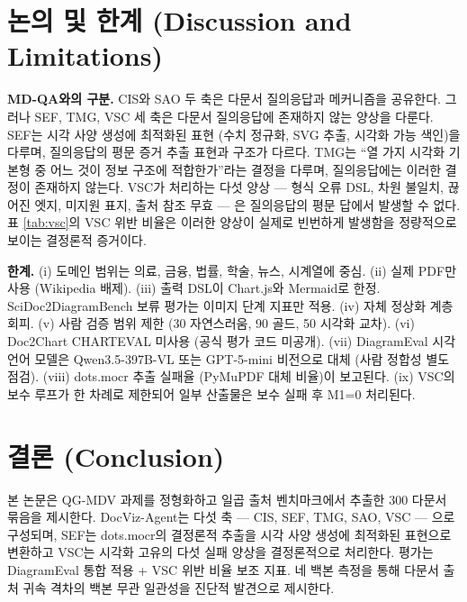 \documentclass[11pt]{article}
\begin{document}
\section{논의 및 한계 (Discussion and Limitations)}

\textbf{MD-QA와의 구분.} CIS와 SAO 두 축은 다문서 질의응답과 메커니즘을 공유한다. 그러나 SEF, TMG, VSC 세 축은 다문서 질의응답에 존재하지 않는 양상을 다룬다. SEF는 시각 사양 생성에 최적화된 표현 (수치 정규화, SVG 추출, 시각화 가능 색인)을 다루며, 질의응답의 평문 증거 추출 표현과 구조가 다르다. TMG는 ``열 가지 시각화 기본형 중 어느 것이 정보 구조에 적합한가''라는 결정을 다루며, 질의응답에는 이러한 결정이 존재하지 않는다. VSC가 처리하는 다섯 양상 — 형식 오류 DSL, 차원 불일치, 끊어진 엣지, 미지원 표지, 출처 참조 무효 — 은 질의응답의 평문 답에서 발생할 수 없다. 표 \ref{tab:vsc}의 VSC 위반 비율은 이러한 양상이 실제로 빈번하게 발생함을 정량적으로 보이는 결정론적 증거이다.

\textbf{한계.} (i) 도메인 범위는 의료, 금융, 법률, 학술, 뉴스, 시계열에 중심. (ii) 실제 PDF만 사용 (Wikipedia 배제). (iii) 출력 DSL이 Chart.js와 Mermaid로 한정. SciDoc2DiagramBench 보류 평가는 이미지 단계 지표만 적용. (iv) 자체 정상화 계층 회피. (v) 사람 검증 범위 제한 (30 자연스러움, 90 골드, 50 시각화 교차). (vi) Doc2Chart CHARTEVAL 미사용 (공식 평가 코드 미공개). (vii) DiagramEval 시각 언어 모델은 Qwen3.5-397B-VL 또는 GPT-5-mini 비전으로 대체 (사람 정합성 별도 점검). (viii) dots.mocr 추출 실패율 (PyMuPDF 대체 비율)이 보고된다. (ix) VSC의 보수 루프가 한 차례로 제한되어 일부 산출물은 보수 실패 후 M1=0 처리된다.

\section{결론 (Conclusion)}

본 논문은 QG-MDV 과제를 정형화하고 일곱 출처 벤치마크에서 추출한 300 다문서 묶음을 제시한다. DocViz-Agent는 다섯 축 — CIS, SEF, TMG, SAO, VSC — 으로 구성되며, SEF는 dots.mocr의 결정론적 추출을 시각 사양 생성에 최적화된 표현으로 변환하고 VSC는 시각화 고유의 다섯 실패 양상을 결정론적으로 처리한다. 평가는 DiagramEval 통합 적용 + VSC 위반 비율 보조 지표. 네 백본 측정을 통해 다문서 출처 귀속 격차의 백본 무관 일관성을 진단적 발견으로 제시한다.
\end{document}
